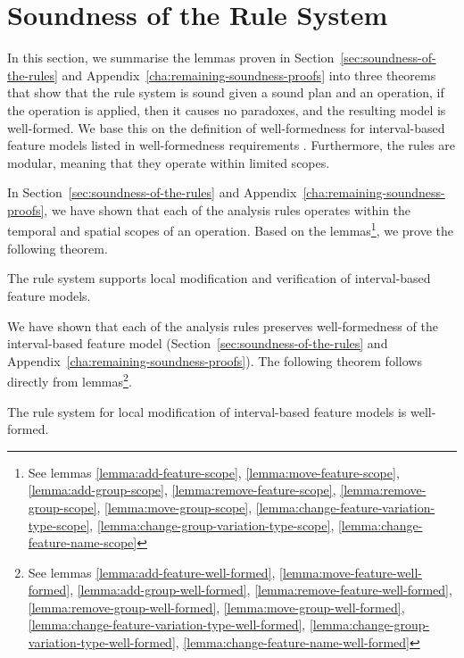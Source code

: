 \section{Soundness of the Rule System}
In this section, we summarise the lemmas proven in Section~\vref{sec:soundness-of-the-rules} and Appendix~\vref{cha:remaining-soundness-proofs} into three theorems that show that the rule system is sound \textemdash{} given a sound plan and an operation, if the operation is applied, then it causes no paradoxes, and the resulting model is well-formed. We base this on the definition of well-formedness for interval-based feature models listed in well-formedness requirements . Furthermore, the rules are modular, meaning that they operate within limited scopes.

In Section~\ref{sec:soundness-of-the-rules} and Appendix~\ref{cha:remaining-soundness-proofs}, we have shown that each of the analysis rules operates within the temporal and spatial scopes of an operation. Based on the lemmas\footnote{See lemmas \ref{lemma:add-feature-scope}, \ref{lemma:move-feature-scope}, \ref{lemma:add-group-scope}, \ref{lemma:remove-feature-scope}, \ref{lemma:remove-group-scope}, \ref{lemma:move-group-scope}, \ref{lemma:change-feature-variation-type-scope}, \ref{lemma:change-group-variation-type-scope}, \ref{lemma:change-feature-name-scope}}, we prove the following theorem.
\\
\begin{theorem}
  The rule system supports local modification and verification of interval-based feature models.
  \label{theorem:scope}
\end{theorem}

We have shown that each of the analysis rules preserves well-formedness of the interval-based feature model (Section~\ref{sec:soundness-of-the-rules} and Appendix~\ref{cha:remaining-soundness-proofs}). The following theorem follows directly from lemmas\footnote{See lemmas \ref{lemma:add-feature-well-formed}, \ref{lemma:move-feature-well-formed}, \ref{lemma:add-group-well-formed}, \ref{lemma:remove-feature-well-formed}, \ref{lemma:remove-group-well-formed}, \ref{lemma:move-group-well-formed}, \ref{lemma:change-feature-variation-type-well-formed}, \ref{lemma:change-group-variation-type-well-formed}, \ref{lemma:change-feature-name-well-formed}}.
\\
\begin{theorem}
  The rule system for local modification of interval-based feature models is well-formed.
  \label{theorem:well-formed}
\end{theorem}

